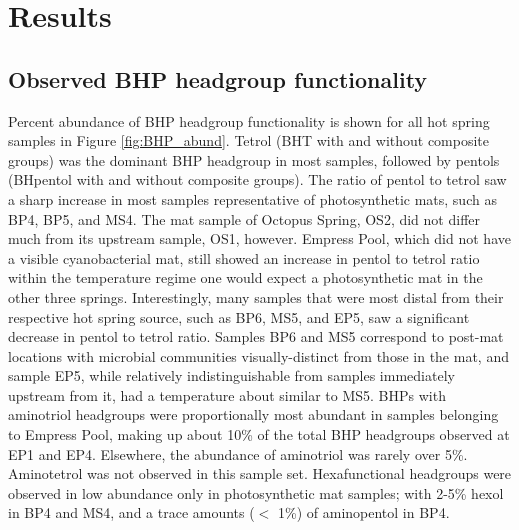 \section{Results}

\subsection{Observed BHP headgroup functionality}


Percent abundance of BHP headgroup functionality is shown for all hot spring samples in Figure \ref{fig:BHP_abund}. Tetrol (BHT with and without composite groups) was the dominant BHP headgroup in most samples, followed by pentols (BHpentol with and without composite groups). The ratio of pentol to tetrol saw a sharp increase in most samples representative of photosynthetic mats, such as BP4, BP5, and MS4. The mat sample of Octopus Spring, OS2, did not differ much from its upstream sample, OS1, however. Empress Pool, which did not have a visible cyanobacterial mat, still showed an increase in pentol to tetrol ratio within the temperature regime one would expect a photosynthetic mat in the other three springs. Interestingly, many samples that were most distal from their respective hot spring source, such as BP6, MS5, and EP5, saw a significant decrease in pentol to tetrol ratio. Samples BP6 and MS5 correspond to post-mat locations with microbial communities visually-distinct from those in the mat, and sample EP5, while relatively indistinguishable from samples immediately upstream from it, had a temperature about similar to MS5. BHPs with aminotriol headgroups were proportionally most abundant in samples belonging to Empress Pool, making up about 10\% of the total BHP headgroups observed at EP1 and EP4. Elsewhere, the abundance of aminotriol was rarely over 5\%. Aminotetrol was not observed in this sample set. Hexafunctional headgroups were observed in low abundance only in photosynthetic mat samples; with 2-5\% hexol in BP4 and MS4, and a trace amounts ($<$ 1\%) of aminopentol in BP4.


